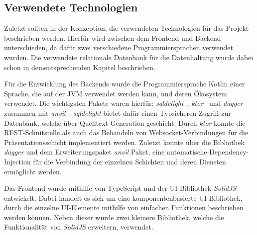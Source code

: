 \subsection{Verwendete Technologien}

Zuletzt sollten in der Konzeption, die verwendeten Technologien für das Projekt
beschrieben werden. Hierfür wird zwischen dem Frontend und Backend
unterschieden, da dafür zwei verschiedene Programmiersprachen verwendet wurden.
Die verwendete relationale Datenbank für die Datenhaltung wurde dabei schon in
dementsprechenden Kapitel beschrieben.

Für die Entwicklung des Backends wurde die Programmiersprache Kotlin einer Sprache,
die auf der JVM verwendet werden kann, und deren Ökosystem verwendet. Die wichtigsten
Pakete waren hierfür: \emph{sqldelight}~\cite{sqldelight}, \emph{ktor}~\cite{ktor}
und \emph{dagger}~\cite{dagger} zusammen mit \emph{anvil}~\cite{anvil}. \emph{sqldelight}
bietet dafür einen Typsicheren Zugriff zur Datenbank, welche über Quelltext-Generation geschieht.
Durch \emph{ktor} konnte die REST-Schnitstelle als auch das Behandeln von Websocket-Verbindungen
für die Präsentationsschicht implementiert werden. Zuletzt konnte über die Bibliothek
\emph{dagger} und dem Erweiterungspaket \emph{anvil} Paket, eine automatische Dependency-Injection
für die Verbindung der einzelnen Schichten und deren Diensten ermöglicht werden.

Das Frontend wurde mithilfe von TypeScript und der UI-Bibliothek
\emph{SolidJS}~\cite{solidjs} entwickelt. Dabei handelt es sich um eine
komponentenbasierte UI-Bibliothek, durch die einzelne UI-Elemente mithilfe von
einfachen Funktionen beschrieben werden können. Neben dieser wurde zwei
kleinere Bibliothek, welche die Funktionalität von \emph{SolidJS} erweitern,
verwendet.
